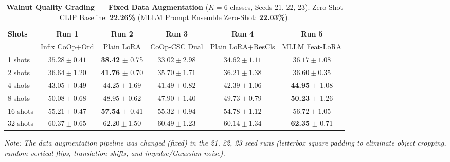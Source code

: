 \documentclass[letterpaper,11pt,leqno]{article}
\begin{document}
\begin{table}[H]
\centering
\small
\setlength{\tabcolsep}{4pt}
\caption{\textbf{Walnut Quality Grading --- Fixed Data Augmentation} ($K=6$ classes, Seeds 21, 22, 23). Zero-Shot CLIP Baseline: \textbf{22.26\%} (MLLM Prompt Ensemble Zero-Shot: \textbf{22.03\%}).}
\label{tab:walnut_fixed_results}
\begin{tabular*}{\textwidth}{@{\extracolsep{\fill}}lccccc}
\toprule
\multirow{2}{*}{\textbf{Shots}} & \textbf{Run 1} & \textbf{Run 2} & \textbf{Run 3} & \textbf{Run 4} & \textbf{Run 5} \\
 & \scriptsize Infix CoOp+Ord & \scriptsize Plain LoRA & \scriptsize CoOp-CSC Dual & \scriptsize Plain LoRA+ResCls & \scriptsize MLLM Feat-LoRA \\
\midrule
 1 shots & $35.28 \pm 0.41$ & \cellcolor{bestgreen}\textbf{38.42} $\pm$ 0.75 & $33.02 \pm 2.98$ & $34.62 \pm 1.11$ & $36.17 \pm 1.08$ \\
 2 shots & $36.64 \pm 1.20$ & \cellcolor{bestgreen}\textbf{41.76} $\pm$ 0.70 & $35.70 \pm 1.71$ & $36.21 \pm 1.38$ & $36.60 \pm 0.35$ \\
 4 shots & $43.05 \pm 0.49$ & $44.25 \pm 1.69$ & $41.49 \pm 0.82$ & $42.39 \pm 1.06$ & \cellcolor{bestgreen}\textbf{44.95} $\pm$ 1.08 \\
 8 shots & $50.08 \pm 0.68$ & $48.95 \pm 0.62$ & $47.90 \pm 1.40$ & $49.73 \pm 0.79$ & \cellcolor{bestgreen}\textbf{50.23} $\pm$ 1.26 \\
16 shots & $55.21 \pm 0.47$ & \cellcolor{bestgreen}\textbf{57.54} $\pm$ 0.41 & $55.32 \pm 0.94$ & $54.78 \pm 1.12$ & $56.72 \pm 1.05$ \\
32 shots & $60.37 \pm 0.65$ & $62.20 \pm 1.50$ & $60.49 \pm 1.23$ & $60.14 \pm 1.34$ & \cellcolor{bestgreen}\textbf{62.35} $\pm$ 0.71 \\
\bottomrule
\end{tabular*}
\vspace{0.3em}
\raggedright\small \textit{Note: The data augmentation pipeline was changed (fixed) in the 21, 22, 23 seed runs (letterbox square padding to eliminate object cropping, random vertical flips, translation shifts, and impulse/Gaussian noise).}
\end{table}
\end{document}
